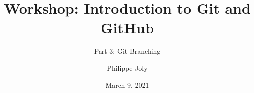 \documentclass[handout]{beamer}
\title[Git/GitHub Workshop: Part 3]{Workshop: Introduction to Git and GitHub}
\subtitle{Part 3: Git Branching}
\author[P. Joly]{Philippe Joly}
\institute[FU-Berlin]{Freie Universität Berlin}
\date{March 9, 2021}
\begin{document}
\begin{frame}
\titlepage
\end{frame}
%

%
%



\end{document}
